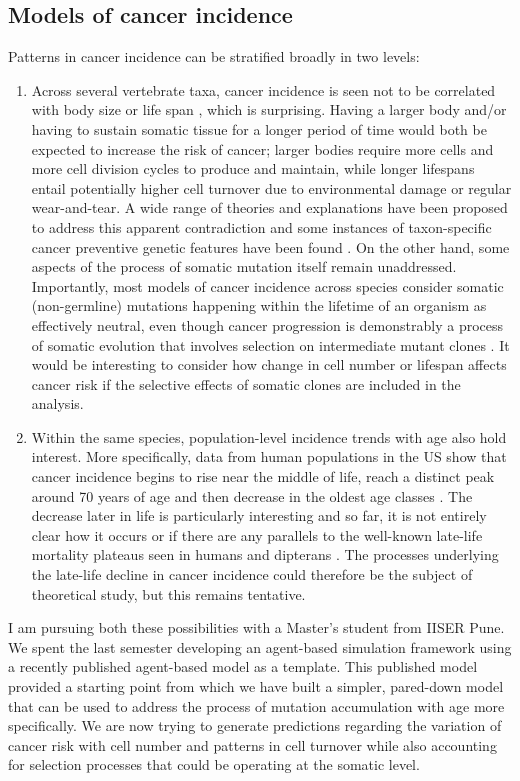 \documentclass[12pt,onecolumn,twoside]{article}
\begin{document}
	\subsection{Models of cancer incidence}
	Patterns in cancer incidence can be stratified broadly in two levels:
	\begin{enumerate}
		\item Across several vertebrate taxa, cancer incidence is seen not to be correlated with body size or life span \citep{Peto2015}, which is surprising. Having a larger body and/or having to sustain somatic tissue for a longer period of time would both be expected to increase the risk of cancer; larger bodies require more cells and more cell division cycles to produce and maintain, while longer lifespans entail potentially higher cell turnover due to environmental damage or regular wear-and-tear. A wide range of theories and explanations have been proposed to address this apparent contradiction and some instances of taxon-specific cancer preventive genetic features have been found \citep{Abegglen2015, Tian2013, Gorbunova2014}. On the other hand, some aspects of the process of somatic mutation itself remain unaddressed. Importantly, most models of cancer incidence across species consider somatic (non-germline) mutations happening within the lifetime of an organism as effectively neutral, even though cancer progression is demonstrably a process of somatic evolution that involves selection on intermediate mutant clones \citep{Nowell1976}. It would be interesting to consider how change in cell number or lifespan affects cancer risk if the selective effects of somatic clones are included in the analysis.
		\item Within the same species, population-level incidence trends with age also hold interest. More specifically, data from human populations in the US show that cancer incidence begins to rise near the middle of life, reach a distinct peak around 70 years of age and then decrease in the oldest age classes \citep{Harding2012}. The decrease later in life is particularly interesting and so far, it is not entirely clear how it occurs or if there are any parallels to the well-known late-life mortality plateaus seen in humans and dipterans \citep{Mueller15249}. The processes underlying the late-life decline in cancer incidence could therefore be the subject of theoretical study, but this remains tentative.
	\end{enumerate}

	I am pursuing both these possibilities with a Master's student from IISER Pune. We spent the last semester developing an agent-based simulation framework using a recently published agent-based model \citep{Erten2020} as a template. This published model provided a starting point from which we have built a simpler, pared-down model that can be used to address the process of mutation accumulation with age more specifically. We are now trying to generate predictions regarding the variation of cancer risk with cell number and patterns in cell turnover while also accounting for selection processes that could be operating at the somatic level.
\end{document}

